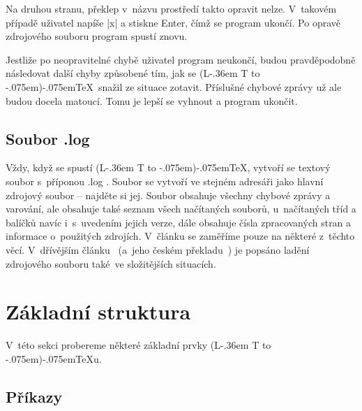 \documentclass{csbulletin}
\makeatletter
\def\soub#1{{\sffamily
  \tmphc\hyphenchar\font
  \hyphenchar\font-1 #1%
  \hyphenchar\font\tmphc}}
\DeclareRobustCommand{\La}{L\kern-.36em%
        {\sbox\z@ T%
         \vbox to\ht\z@{\hbox{\check@mathfonts
                              \fontsize\sf@size\z@
                              \math@fontsfalse\selectfont
                              A}%
                        \vss}%
        }}
\def\AllTeX{(\La\kern-.075em)\kern-.075em\TeX}
\makeatother
\begin{document}
Na druhou stranu, překlep v~názvu prostředí takto opravit nelze. V~takovém případě uživatel napíše |x| a stiskne Enter, čímž se program ukončí. Po opravě zdrojového souboru program spustí znovu.

Jestliže po neopravitelné chybě uživatel program neukončí, budou pravděpodobně následovat další chyby způsobené tím, jak se \AllTeX\ snažil ze situace zotavit. Příslušné chybové zprávy už ale budou docela matoucí. Tomu je lepší se vyhnout a program ukončit.

\subsection{Soubor \soub{.log}}

Vždy, když se spustí \AllTeX, vytvoří se textový soubor s~příponou \soub{.log}. Soubor se vytvoří ve stejném adresáři jako hlavní zdrojový soubor -- najděte si jej. Soubor obsahuje všechny chybové zprávy a varování, ale obsahuje také seznam všech načítaných souborů, u~načítaných tříd a balíčků navíc i~s~uvedením jejich verze, dále obsahuje čísla zpracovaných stran a informace o~použitých zdrojích. V~článku se zaměříme pouze na některé z~těchto věcí. V~dřívějším článku~\cite{debug} (a~jeho českém překladu~\cite{debugCZ}) je popsáno ladění zdrojového souboru také~ve složitějších situacích.


%
%

\section{Základní struktura}

V~této sekci probereme některé základní prvky \AllTeX u.

\subsection{Příkazy}
\end{document}
